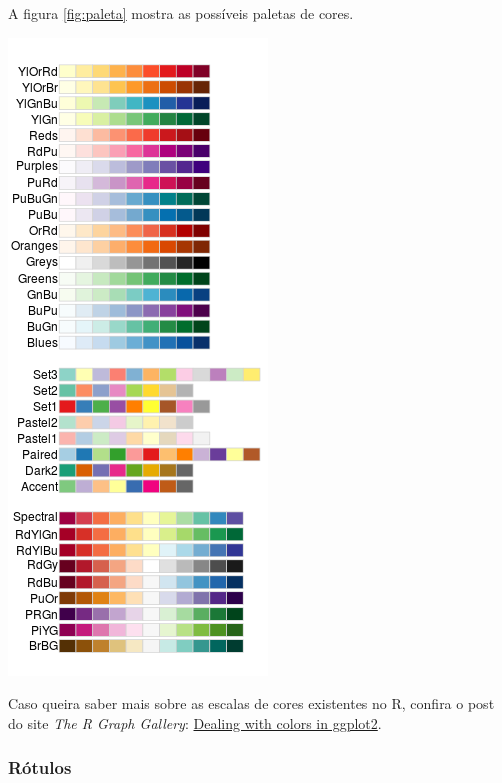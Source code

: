 \documentclass[
  brazilian,
]{book}
\let\origfigure\figure
\let\endorigfigure\endfigure
\renewenvironment{figure}[1][2] {
    \expandafter\origfigure\expandafter[H]
} {
    \endorigfigure
}
\begin{document}
A figura \ref{fig:paleta} mostra as possíveis paletas de cores.

\begin{figure}

{\centering \includegraphics[width=0.5\linewidth]{imagens/paleta_cor} 

}

\caption{Nome das paletas de cores disponíveis para aplicarmos em nossos gráficos. Fonte: *The R Graph Gallery*.}\label{fig:paleta}
\end{figure}

Caso queira saber mais sobre as escalas de cores existentes no R, confira o post do site \emph{The R Graph Gallery}: \href{https://www.r-graph-gallery.com/ggplot2-color.html}{Dealing with colors in ggplot2}.

\hypertarget{ruxf3tulos}{%
\subsubsection*{Rótulos}\label{ruxf3tulos}}
\end{document}
